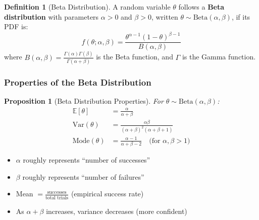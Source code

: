 \documentclass[11pt,a4paper]{article}
\theoremstyle{definition}
\newtheorem{definition}{Definition}[section]
\theoremstyle{plain}
\newtheorem{proposition}{Proposition}[section]
\newcommand{\E}{\mathbb{E}}
\newcommand{\Var}{\text{Var}}
\begin{document}
\begin{definition}[Beta Distribution]
A random variable $\theta$ follows a \textbf{Beta distribution} with parameters $\alpha > 0$ and $\beta > 0$, written $\theta \sim \text{Beta}(\alpha, \beta)$, if its PDF is:
\begin{equation}
f(\theta; \alpha, \beta) = \frac{\theta^{\alpha-1}(1-\theta)^{\beta-1}}{B(\alpha, \beta)}
\end{equation}
where $B(\alpha, \beta) = \frac{\Gamma(\alpha)\Gamma(\beta)}{\Gamma(\alpha+\beta)}$ is the Beta function, and $\Gamma$ is the Gamma function.
\end{definition}

\subsubsection{Properties of the Beta Distribution}

\begin{proposition}[Beta Distribution Properties]
For $\theta \sim \text{Beta}(\alpha, \beta)$:
\begin{align}
\E[\theta] &= \frac{\alpha}{\alpha + \beta} \\
\Var(\theta) &= \frac{\alpha\beta}{(\alpha+\beta)^2(\alpha+\beta+1)} \\
\text{Mode}(\theta) &= \frac{\alpha - 1}{\alpha + \beta - 2} \quad \text{(for } \alpha, \beta > 1\text{)}
\end{align}
\end{proposition}

\begin{intuition}
\begin{itemize}
    \item $\alpha$ roughly represents ``number of successes''
    \item $\beta$ roughly represents ``number of failures''
    \item Mean $= \frac{\text{successes}}{\text{total trials}}$ (empirical success rate)
    \item As $\alpha + \beta$ increases, variance decreases (more confident)
\end{itemize}
\end{intuition}
\end{document}
